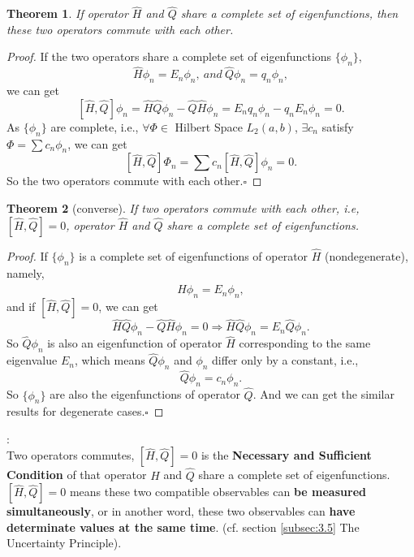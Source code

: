 \documentclass[12pt, 
]{article}
\newtheorem*{thm}{Theorem}
\newtheorem*{proof}{Proof}
\begin{document}
\begin{thm}
	If operator $\hat{H}$ and $\hat{Q}$ share a complete set of eigenfunctions, then these two operators commute with each other.
\end{thm}
\begin{proof}
	If the two operators share a complete set of eigenfunctions $\{\phi_n\}$,
	$$\hat{H}\phi_n=E_n\phi_n,~\textit{and}~\hat{Q}\phi_n=q_n\phi_n,$$
we can get 
	$$[\hat{H},\hat{Q}]\phi_n=\hat{H}\hat{Q}\phi_n-\hat{Q}\hat{H}\phi_n=E_nq_n\phi_n-q_nE_n\phi_n=0.$$
As $\{\phi_n\}$ are complete, i.e., $\forall\varPhi\in$ Hilbert Space $L_2(a,b)$, $\exists c_n$ satisfy $\varPhi=\sum c_n\phi_n$, we can get
	$$[\hat{H},\hat{Q}]\varPhi_n=\sum c_n[\hat{H},\hat{Q}]\phi_n=0.$$
	So the two operators commute with each other.\hfill$\square$

\end{proof}

\begin{thm}[converse]
	If two operators commute with each other, i.e, $[\hat{H}, \hat{Q}]=0$, operator $\hat{H}$ and $\hat{Q}$ share a complete set of eigenfunctions.
\end{thm}
\begin{proof}
	If $\{\phi_n\}$ is a complete set of eigenfunctions of operator $\hat{H}$ (nondegenerate), namely,
	$$\hat{H}\phi_n=E_n\phi_n,$$
	and if $[\hat{H},\hat{Q}]=0$, we can get
	$$\hat{H}\hat{Q}\phi_n-\hat{Q}\hat{H}\phi_n=0\Rightarrow\hat{H}\hat{Q}\phi_n=E_n\hat{Q}\phi_n.$$
	So $\hat{Q}\phi_n$ is also an eigenfunction of operator $\hat{H}$ corresponding to the same eigenvalue $E_n$, which means $\hat{Q}\phi_n$ and $\phi_n$ differ only by a constant, i.e.,
	$$\hat{Q}\phi_n=c_n\phi_n.$$
	So $\{\phi_n\}$ are also the eigenfunctions of operator $\hat{Q}$. And we can get the similar results for degenerate cases.\hfill$\square$
\end{proof}

:
~\\

Two operators commutes, $[\hat{H},\hat{Q}]=0$ is the {\bf Necessary and Sufficient Condition} of that operator $\hat{H}$ and $\hat{Q}$ share a complete set of eigenfunctions.
~\\

$[\hat{H},\hat{Q}]=0$ means these two compatible observables can {\bf be measured simultaneously}, or in another word, these two observables can {\bf have determinate values at the same time}. (cf. section \ref{subsec:3.5} The Uncertainty Principle).
\end{document}
